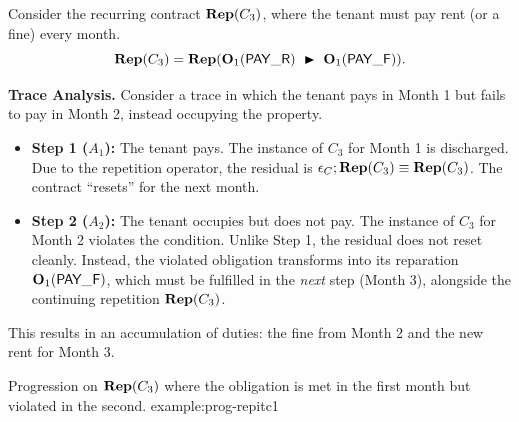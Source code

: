 \begin{example}
Consider the recurring contract $\repit{C_3}$, where the tenant must pay rent (or a fine) every month.
\[ \repit{C_3} = \repit{ \obl[1]{\PAY}\ \repair\ \obl[1]{\PAYF}}. \]

\noindent\textbf{Trace Analysis.}
Consider a trace in which the tenant pays in Month 1 but fails to pay in Month 2, instead occupying the property.
\begin{itemize}
    \item \textbf{Step 1 ($A_1$):} The tenant pays. The instance of $C_3$ for Month 1 is discharged. Due to the repetition operator, the residual is $\emptc; \repit{C_3} \equiv \repit{C_3}$. The contract ``resets'' for the next month.
    \item \textbf{Step 2 ($A_2$):} The tenant occupies but does not pay. The instance of $C_3$ for Month 2 violates the condition. Unlike Step 1, the residual does not reset cleanly. Instead, the violated obligation transforms into its reparation $\obl[1]{\PAYF}$, which must be fulfilled in the \emph{next} step (Month 3), alongside the continuing repetition $\repit{C_3}$.
\end{itemize}
This results in an accumulation of duties: the fine from Month 2 and the new rent for Month 3.

  {Progression on $\repit{C_3}$ where the obligation is met in the first month but violated in the second.}
  {example:prog-repitc1}
  {\vspace{8pt}}{\vspace{-12pt}}
\end{example}

